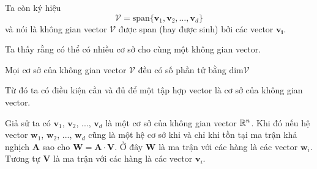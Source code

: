 Ta còn ký hiệu 
\[\mathcal{V} = \text{span} \{\bm{v}_1, \bm{v}_2, \ldots, \bm{v}_d\}\]
và nói là không gian vector $\mathcal{V}$ được span (hay được sinh) bởi các vector $\bm{v_i}$.

Ta thấy rằng có thể có nhiều cơ sở cho cùng một không gian vector.

\begin{theorem}
    Mọi cơ sở của không gian vector $\mathcal{V}$ đều có số phần tử bằng $\text{dim} \mathcal{V}$
\end{theorem}

Từ đó ta có điều kiện cần và đủ để một tập hợp vector là cơ sở của không gian vector.

Giả sử ta có $\bm{v}_1$, $\bm{v}_2$, ..., $\bm{v}_d$ là một cơ sở của không gian vector $\mathbb{R}^n$.
Khi đó nếu hệ vector $\bm{w}_1$, $\bm{w}_2$, ..., $\bm{w}_d$ cũng là một hệ cơ sở khi và chỉ khi tồn 
tại ma trận khả nghịch $\bm{A}$ sao cho $\bm{W} = \bm{A} \cdot \bm{V}$. Ở đây $\bm{W}$ là ma trận với các hàng là các vector $\bm{w}_i$. Tương tự $\bm{V}$ là ma trận với các hàng là các vector $\bm{v}_i$.

